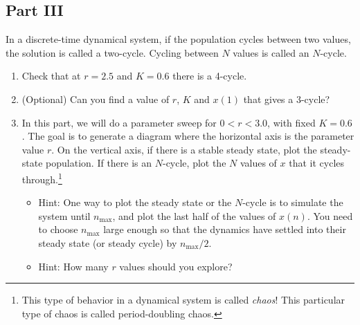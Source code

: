 \documentclass[
  letterpaper,
  DIV=11,
  numbers=noendperiod]{scrartcl}
\providecommand{\tightlist}{%
  \setlength{\itemsep}{0pt}\setlength{\parskip}{0pt}}
\begin{document}
\subsection{Part III}\label{part-iii}

In a discrete-time dynamical system, if the population cycles between
two values, the solution is called a two-cycle. Cycling between \(N\)
values is called an \(N\)-cycle.

\begin{enumerate}
\def\labelenumi{\alph{enumi}.}
\setcounter{enumi}{4}
\item
  Check that at \(r=2.5\) and \(K=0.6\) there is a 4-cycle.
\item
  (Optional) Can you find a value of \(r\), \(K\) and \(x(1)\) that
  gives a 3-cycle?
\item
  In this part, we will do a parameter sweep for \(0<r<3.0\), with fixed
  \(K=0.6\). The goal is to generate a diagram where the horizontal axis
  is the parameter value \(r\). On the vertical axis, if there is a
  stable steady state, plot the steady-state population. If there is an
  \(N\)-cycle, plot the \(N\) values of \(x\) that it cycles
  through.\footnote{This type of behavior in a dynamical system is
    called \emph{chaos}! This particular type of chaos is called
    period-doubling chaos.}

  \begin{itemize}
  \tightlist
  \item
    Hint: One way to plot the steady state or the \(N\)-cycle is to
    simulate the system until \(n_\mathrm{max}\), and plot the last half
    of the values of \(x(n)\). You need to choose \(n_\mathrm{max}\)
    large enough so that the dynamics have settled into their steady
    state (or steady cycle) by \(n_\mathrm{max}/2\).
  \item
    Hint: How many \(r\) values should you explore?
  \end{itemize}
\end{enumerate}
\end{document}
